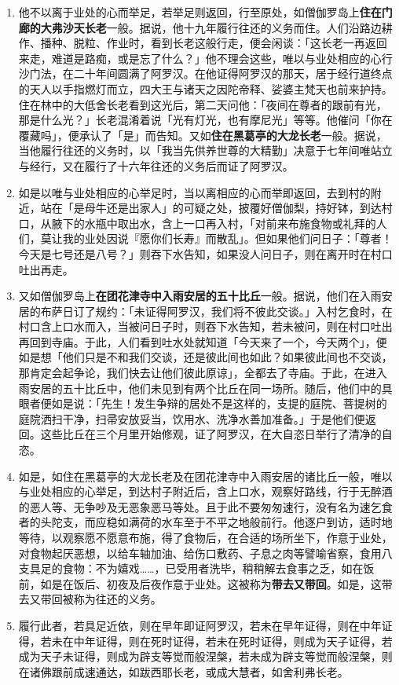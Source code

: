 \begin{enumerate}
\item 他不以离于业处的心而举足，若举足则返回，行至原处，如僧伽罗岛上\textbf{住在门廊的大弗沙天长老}一般。据说，他十九年履行往还的义务而住。人们沿路边耕作、播种、脱粒、作业时，看到长老这般行走，便会闲谈：「这长老一再返回来走，难道是路痴，或是忘了什么？」他不理会这些，唯以与业处相应的心行沙门法，在二十年间圆满了阿罗汉。在他证得阿罗汉的那天，居于经行道终点的天人以手指燃灯而立，四大王与诸天之因陀帝释、娑婆主梵天也前来护持。住在林中的大低舍长老看到这光后，第二天问他：「夜间在尊者的跟前有光，那是什么光？」长老混淆着说「光有灯光，也有摩尼光」等等。他催问「你在覆藏吗」，便承认了「是」而告知。又如\textbf{住在黑葛亭的大龙长老}一般。据说，当他履行往还的义务时，以「我当先供养世尊的大精勤」决意于七年间唯站立与经行，又在履行了十六年往还的义务后而证了阿罗汉。
\item 如是以唯与业处相应的心举足时，当以离相应的心而举即返回，去到村的附近，站在「是母牛还是出家人」的可疑之处，披覆好僧伽梨，持好钵，到达村口，从腋下的水瓶中取出水，含上一口再入村，「对前来布施食物或礼拜的人们，莫让我的业处因说『愿你们长寿』而散乱」。但如果他们问日子：「尊者！今天是七号还是八号？」则吞下水告知，如果没人问日子，则在离开时在村口吐出再走。
\item 又如僧伽罗岛上\textbf{在团花津寺中入雨安居的五十比丘}一般。据说，他们在入雨安居的布萨日订了规约：「未证得阿罗汉，我们将不彼此交谈。」入村乞食时，在村口含上口水而入，当被问日子时，则吞下水告知，若未被问，则在村口吐出再回到寺庙。于此，人们看到吐水处就知道「今天来了一个，今天两个」，便如是想「他们只是不和我们交谈，还是彼此间也如此？如果彼此间也不交谈，那肯定会起争论，我们快去让他们彼此原谅」，全都去了寺庙。于此，在进入雨安居的五十比丘中，他们未见到有两个比丘在同一场所。随后，他们中的具眼者便如是说：「先生！发生争辩的居处不是这样的，支提的庭院、菩提树的庭院洒扫干净，扫帚安放妥当，饮用水、洗净水善加准备。」于是他们便返回。这些比丘在三个月里开始修观，证了阿罗汉，在大自恣日举行了清净的自恣。
\item 如是，如住在黑葛亭的大龙长老及在团花津寺中入雨安居的诸比丘一般，唯以与业处相应的心举足，到达村子附近后，含上口水，观察好路线，行于无醉酒的恶人等、无争吵及无恶象恶马等处。且于此不要匆匆速行，没有名为速乞食者的头陀支，而应稳如满荷的水车至于不平之地般前行。他逐户到访，适时地等待，以观察愿不愿意布施，得了食物后，在合适的场所坐下，作意于业处，对食物起厌恶想，以给车轴加油、给伤口敷药、子息之肉等譬喻省察，食用八支具足的食物：不为嬉戏……，已受用者洗毕，稍稍解去食事之乏，如在饭前，如是在饭后、初夜及后夜作意于业处。这被称为\textbf{带去又带回}。如是，这带去又带回被称为往还的义务。
\item 履行此者，若具足近依，则在早年即证阿罗汉，若未在早年证得，则在中年证得，若未在中年证得，则在死时证得，若未在死时证得，则成为天子证得，若成为天子未证得，则成为辟支等觉而般涅槃，若未成为辟支等觉而般涅槃，则在诸佛跟前成速通达，如跋西耶长老，或成大慧者，如舍利弗长老。

\end{enumerate}
